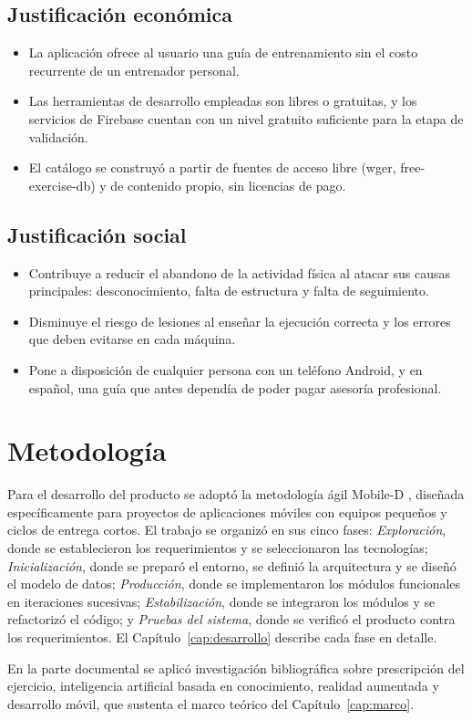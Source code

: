\subsection{Justificación económica}

\begin{itemize}
    \item La aplicación ofrece al usuario una guía de entrenamiento sin el
    costo recurrente de un entrenador personal.
    \item Las herramientas de desarrollo empleadas son libres o gratuitas, y
    los servicios de Firebase cuentan con un nivel gratuito suficiente para la
    etapa de validación.
    \item El catálogo se construyó a partir de fuentes de acceso libre (wger,
    free-exercise-db) y de contenido propio, sin licencias de pago.
\end{itemize}

\subsection{Justificación social}

\begin{itemize}
    \item Contribuye a reducir el abandono de la actividad física al atacar
    sus causas principales: desconocimiento, falta de estructura y falta de
    seguimiento.
    \item Disminuye el riesgo de lesiones al enseñar la ejecución correcta y
    los errores que deben evitarse en cada máquina.
    \item Pone a disposición de cualquier persona con un teléfono Android, y en
    español, una guía que antes dependía de poder pagar asesoría profesional.
\end{itemize}

\section{Metodología}
\label{sec:metodologia}

Para el desarrollo del producto se adoptó la metodología ágil Mobile-D
\citep{abrahamsson2004}, diseñada específicamente para proyectos de
aplicaciones móviles con equipos pequeños y ciclos de entrega cortos. El
trabajo se organizó en sus cinco fases: \emph{Exploración}, donde se
establecieron los requerimientos y se seleccionaron las tecnologías;
\emph{Inicialización}, donde se preparó el entorno, se definió la arquitectura
y se diseñó el modelo de datos; \emph{Producción}, donde se implementaron los
módulos funcionales en iteraciones sucesivas; \emph{Estabilización}, donde se
integraron los módulos y se refactorizó el código; y \emph{Pruebas del
sistema}, donde se verificó el producto contra los requerimientos. El
Capítulo~\ref{cap:desarrollo} describe cada fase en detalle.

En la parte documental se aplicó investigación bibliográfica sobre
prescripción del ejercicio, inteligencia artificial basada en conocimiento,
realidad aumentada y desarrollo móvil, que sustenta el marco teórico del
Capítulo~\ref{cap:marco}.
